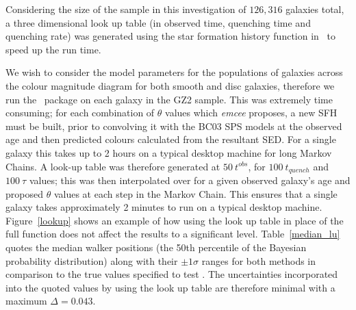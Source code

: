 \begin{table}
\label{median_lu}
\end{table}

Considering the size of the sample in this investigation of $126,316$ galaxies total, a three dimensional look up table (in observed time, quenching time and quenching rate) was generated using the star formation history function in \starpy ~to speed up the run time. 

We wish to consider the model parameters for the populations of galaxies across the colour magnitude diagram for both smooth and disc galaxies, therefore we run the \starpy ~package on each galaxy in the GZ2 sample. This was extremely time consuming; for each combination of $\theta$ values which \emph{emcee} proposes, a new SFH must be built, prior to convolving it with the BC03 SPS models at the observed age and then predicted colours calculated from the resultant SED. For a single galaxy this takes up to 2 hours on a typical desktop machine for long Markov Chains. A look-up table was therefore generated at $50 ~t^{obs}$, for $100 ~t_{quench}$ and $100 ~\tau$ values; this was then interpolated over for a given observed galaxy's age and proposed $\theta$ values at each step in the Markov Chain. This ensures that a single galaxy takes approximately 2 minutes to run on a typical desktop machine. Figure~\ref{lookup} shows an example of how using the look up table in place of the full function does not affect the results to a significant level. Table~\ref{median_lu} quotes the median walker positions (the 50th percentile of the Bayesian probability distribution) along with their $\pm 1\sigma$ ranges for both methods in comparison to the true values specified to test \starpy. The uncertainties incorporated into the quoted values by using the look up table are therefore minimal with a maximum $\Delta = 0.043$.

